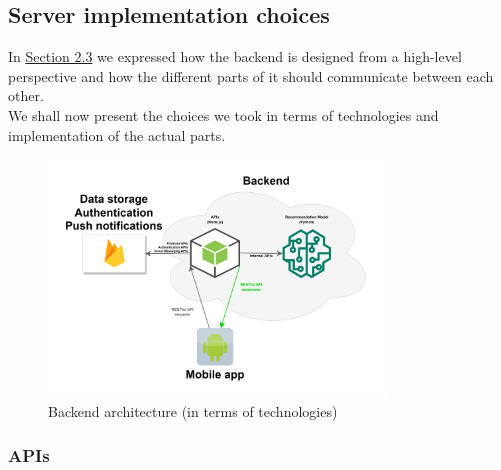 \documentclass[../../main]{subfiles}
\begin{document}
\subsection{Server implementation choices}
\label{ss:server-implementation-choices}

In \hyperref[ss:backend-architecture]{Section 2.3} we expressed how the backend is designed from a high-level perspective and how the different parts of it should communicate between each other.\\
We shall now present the choices we took in terms of technologies and implementation of the actual parts.

\begin{figure}[h]
    \centering
    \includegraphics[width=0.8\textwidth]{images/backend_architecture_technologies}
    \caption{Backend architecture (in terms of technologies)}\label{fig:backend_architecture_technologies}
\end{figure}

\subsubsection{APIs}
\label{sss:apis}
\end{document}
